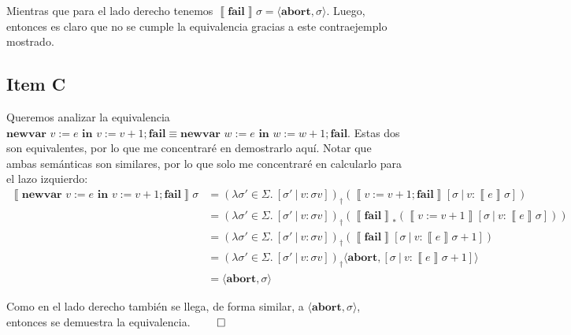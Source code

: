 \documentclass{article}
\newcommand{\sem}[1]{\left\llbracket #1\right\rrbracket}
\newcommand{\cnewvar}[3]{\textbf{newvar }#1 := #2\textbf{ in }#3}
\newcommand{\cfail}{\textbf{fail}}
\newcommand{\cabort}[1]{\langle\textbf{abort}, #1\rangle}
\begin{document}
Mientras que para el lado derecho tenemos $\sem{\cfail}\sigma = \cabort{\sigma}$.
Luego, entonces es claro que no se cumple la equivalencia gracias a este contraejemplo mostrado.

\subsection*{Item C}
Queremos analizar la equivalencia $\cnewvar{v}{e}{v := v+1}; \cfail \equiv \cnewvar{w}{e}{w := w+1}; \cfail$.
Estas dos son equivalentes, por lo que me concentraré en demostrarlo aquí.
Notar que ambas semánticas son similares, por lo que solo me concentraré en calcularlo para el lazo izquierdo:
\begin{equation*}
  \begin{aligned}
    \sem{\cnewvar{v}{e}{v := v+1}; \cfail}\sigma &= (\lambda \sigma' \in \Sigma.\ [\sigma'\ |\ v : \sigma v])_\dagger (\sem{v := v+1; \cfail}[\sigma\ |\ v : \sem{e}\sigma]) \\ 
                                                 &= (\lambda \sigma' \in \Sigma .\ [\sigma'\ |\ v : \sigma v])_\dagger (\sem{\cfail}_* (\sem{v := v+1}[\sigma\ |\ v : \sem{e}\sigma])) \\ 
                                                 &= (\lambda \sigma' \in \Sigma .\ [\sigma'\ |\ v : \sigma v])_\dagger (\sem{\cfail} [\sigma\ |\ v : \sem{e}\sigma+1]) \\ 
                                                 &= (\lambda \sigma' \in \Sigma .\ [\sigma'\ |\ v : \sigma v])_\dagger \cabort{[\sigma\ |\ v : \sem{e}\sigma+1]} \\ 
                                                 &= \cabort{\sigma}
  \end{aligned}
\end{equation*}

Como en el lado derecho también se llega, de forma similar, a $\cabort{\sigma}$, entonces se demuestra la equivalencia. $\qed$
\end{document}
